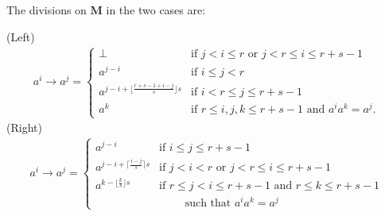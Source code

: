 \documentclass[professionalfont, 10pt]{beamer} %
\theoremstyle{plain}
\theoremstyle{definition}
\newcommand{\m}[1]{{\mathbf {#1} }}
\begin{document}
\begin{frame}
    The divisions on $\m M$ in the two cases are:

    (Left)
    \begin{align*}
    a^i \rightarrow a^j =
    \begin{cases}
        \bot & \text{if } j < i \leq r  \text{ or } j< r \leq i \leq r+s-1\\
        a^{j-i} & \text{if } i \leq j < r\\
        a^{j-i+\lfloor \frac{r+s-1+i-j}{s} \rfloor s} & \text{if } i < r \leq j \leq r+s-1\\
        a^k & \text{if }  r \leq i, j, k \leq r+s-1 \text{ and } a^i a^k = a^j.
    \end{cases}
    \end{align*}
    (Right)
    \begin{align*}
    a^i \rightarrow a^j =
    \begin{cases}
        a^{j-i} & \text{if } i \leq j \leq r+s-1\\
        a^{j-i+\lceil \frac{i-j}{s} \rceil s} & \text{if } j < i < r \text{ or }  j < r \leq i \leq r+s-1\\
        a^{k-\lfloor \frac{k}{s} \rfloor s} & \text{if } r \leq j < i \leq r+s-1 \text{ and } r \leq k \leq r+s-1\\
                & \qquad \text{ such that } a^i a^k = a^j
    \end{cases}
    \end{align*}
\end{frame}
\end{document}
